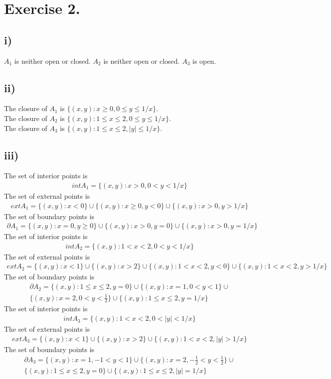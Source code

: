 \documentclass{article}
\begin{document}
\section*{Exercise 2.}
\subsection*{i)}
$A_1$ is neither open or closed. $A_2$ is neither open or closed. $A_3$ is open.
\subsection*{ii)}
The closure of $A_1$ is $\lbrace(x,y):x\geq0,0\leq y\leq 1/x\rbrace$.\\
The closure of $A_2$ is $\lbrace(x,y):1\leq x\leq2,0\leq y\leq 1/x\rbrace$.\\
The closure of $A_3$ is $\lbrace(x,y):1\leq x\leq2,\mid y\mid\leq 1/x\rbrace$.
\subsection*{iii)}
The set of interior points is
\begin{align*}
intA_1=\lbrace(x,y):x>0,0<y<1/x\rbrace
\end{align*}
The set of external points is
\begin{align*}
extA_1=\lbrace(x,y):x<0\rbrace\cup\lbrace(x,y):x\geq0,y<0\rbrace\cup\lbrace(x,y):x>0,y>1/x\rbrace
\end{align*}
The set of boundary points is
\begin{align*}
\partial A_1=\lbrace(x,y):x=0,y\geq0\rbrace\cup\lbrace(x,y):x>0,y=0\rbrace\cup\lbrace(x,y):x>0,y=1/x\rbrace
\end{align*}
The set of interior points is
\begin{align*}
intA_2=\lbrace(x,y):1<x<2,0<y<1/x\rbrace
\end{align*}
The set of external points is
\begin{align*}
extA_2=\lbrace(x,y):x<1\rbrace\cup\lbrace(x,y):x>2\rbrace\cup\lbrace(x,y):1<x<2,y<0\rbrace\cup\lbrace(x,y):1<x<2,y>1/x\rbrace
\end{align*}
The set of boundary points is
\begin{align*}
\partial A_2=\lbrace(x,y):1\leq x\leq2,y=0\rbrace\cup\lbrace(x,y):x=1,0<y<1\rbrace\cup\\
\lbrace(x,y):x=2,0<y<\frac{1}{2}\rbrace\cup\lbrace(x,y):1\leq x\leq2,y=1/x\rbrace
\end{align*}
The set of interior points is
\begin{align*}
intA_3=\lbrace(x,y):1<x<2,0<\mid y\mid<1/x\rbrace
\end{align*}
The set of external points is
\begin{align*}
extA_3=\lbrace(x,y):x<1\rbrace\cup\lbrace(x,y):x>2\rbrace\cup\lbrace(x,y):1<x<2,\mid y\mid>1/x\rbrace
\end{align*}
The set of boundary points is
\begin{align*}
\partial A_3=\lbrace(x,y):x=1,-1<y<1\rbrace\cup\lbrace(x,y):x=2,-\frac{1}{2}<y<\frac{1}{2}\rbrace\cup\\
\lbrace(x,y):1\leq x\leq2,y=0\rbrace\cup\lbrace(x,y):1\leq x\leq2,\mid y\mid=1/x\rbrace
\end{align*}
\end{document}
